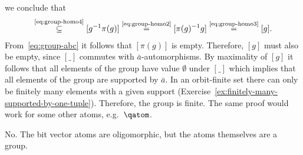 {we conclude that 
\begin{align*}
 [\pi(g)] \stackrel {\text{\eqref{eq:group-homo4}}} \subseteq [ g^{-1} \pi(g)] \stackrel {\text{\eqref{eq:group-homo2}}}= [\pi(g)^{-1}g] \stackrel {\text{\eqref{eq:group-homo3}}}= [g].
\end{align*}
From~\eqref{eq:group-abc} it follows that $[\pi(g)]$ is empty. Therefore, $[g]$ must also be empty, since $[\_]$ commutes with $\bar a$-automorphisms. 
By maximality of $[g]$ it follows that all elements of the group have value $\emptyset$ under $[\_]$ which implies that all elements of the group are supported by $\bar a$. In an orbit-finite set there can only be finitely many elements with a given support (Exercise~\ref{ex:finitely-many-supported-by-one-tuple}). Therefore, the group is finite.
The same proof would work for some other atoms, e.g.~$\qatom$.}


 {No. The bit vector atoms are oligomorphic, but the atoms themselves are a group.}

